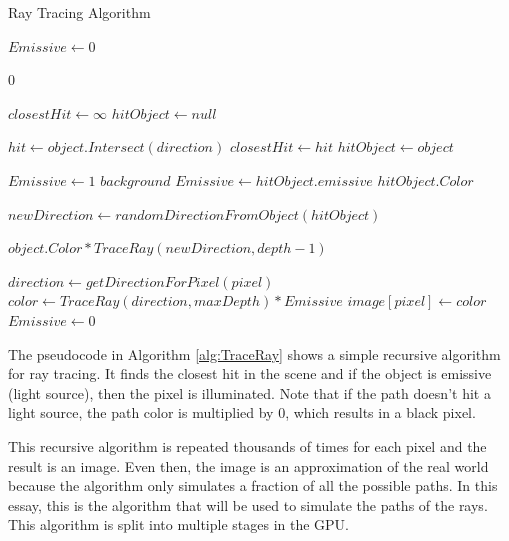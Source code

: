 \documentclass[12pt]{article}
\begin{document}
\begin{algorithm}[H]
\caption{Ray Tracing Algorithm}
\label{alg:TraceRay}
\tiny
\begin{algorithmic}[0]

\State $Emissive \gets 0$

        \State \Return $0$ 
    \EndIf

    \State $closestHit \gets \infty$
    \State $hitObject \gets null$

        \State $hit \gets object.Intersect(direction)$
            \State $closestHit \gets hit$
            \State $hitObject \gets object$
        \EndIf
    \EndFor

        \State $Emissive \gets 1$ 
        \State \Return $background$
    \EndIf
    \State $Emissive \gets hitObject.emissive$
     
        \State \Return $hitObject.Color$
    \EndIf

    \State $newDirection \gets randomDirectionFromObject(hitObject)$

    \State \Return $object.Color * TraceRay(newDirection, depth - 1)$

\EndProcedure

    \State $direction \gets getDirectionForPixel(pixel)$
    \State $color \gets TraceRay(direction, maxDepth) * Emissive$
    \State $image[pixel] \gets color$
    \State $Emissive \gets 0$ 
\EndFor

\end{algorithmic}
\end{algorithm}

The pseudocode in Algorithm \ref{alg:TraceRay} shows a simple recursive algorithm for ray tracing.
It finds the closest hit in the scene and if the object is emissive (light source), then the pixel is illuminated.
Note that if the path doesn't hit a light source, the path color is multiplied by 0, which results in a black pixel.

This recursive algorithm is repeated thousands of times for each pixel and the result is an image.
Even then, the image is an approximation of the real world because the algorithm only simulates a fraction of all the possible paths.
In this essay, this is the algorithm that will be used to simulate the paths of the rays.
This algorithm is split into multiple stages in the GPU.
\end{document}
